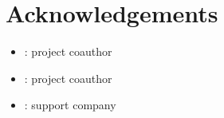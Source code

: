 \documentclass[letterpaper,10pt,english]{sphinxmanual}
\begin{document}
\section{Acknowledgements}
\label{\detokenize{index:acknowledgements}}\begin{itemize}
\item {} 
 : project co\sphinxhyphen{}author

\item {} 
: project co\sphinxhyphen{}author

\item {} 
: support company

\end{itemize}


\renewcommand{\indexname}{Python Module Index}
\end{document}
